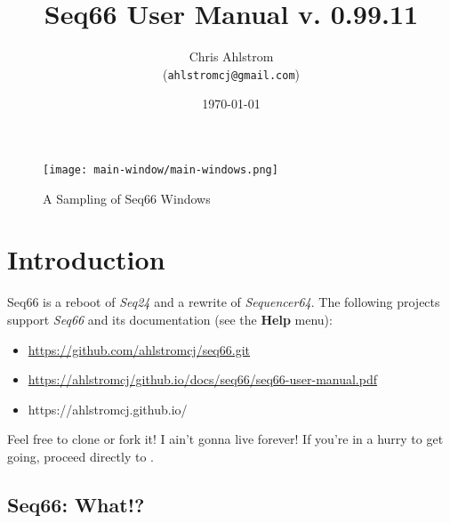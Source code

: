 \documentclass[
 11pt,
 twoside,
 a4paper,
 final                                 %
]{article}
\begin{document}
\title{Seq66 User Manual v. 0.99.11}
\author{Chris Ahlstrom \\
   (\texttt{ahlstromcj@gmail.com})}
\date{\today}
\maketitle

\begin{figure}[H]
   \centering 
   \texttt{[image: main-window/main-windows.png]}
   \caption*{A Sampling of Seq66 Windows}
\end{figure}

\clearpage                             %

\tableofcontents
\listoffigures                         %
\listoftables                          %

%

\parindent 0pt
\parskip 9pt

\rhead{\rightmark}         %

\section{Introduction}
\label{sec:introduction}

   Seq66 is a reboot of \textsl{Seq24} and a rewrite of
   \textsl{Sequencer64}.
   The following projects support \textsl{Seq66} and its documentation (see
   the \textbf{Help} menu):

   \begin{itemize}
      \item \url{https://github.com/ahlstromcj/seq66.git}
      \item \url{https://ahlstromcj/github.io/docs/seq66/seq66-user-manual.pdf}
      \item https://ahlstromcj.github.io/
   \end{itemize}

   Feel free to clone or fork it!
   I ain't gonna live forever!
   If you're in a hurry to get going, proceed directly to
   .

\subsection{Seq66: What!?}
\label{subsec:what_is_seq66}
\end{document}
